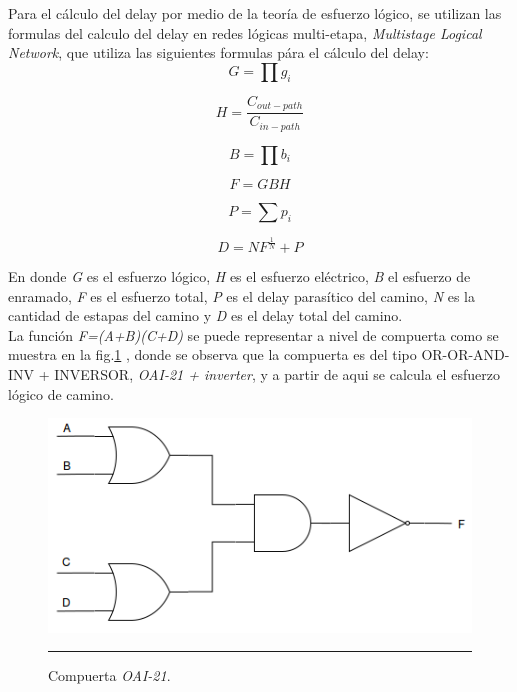 \documentclass[12pt,a4paper]{article} %
\begin{document}
{Para el cálculo del delay por medio de la teoría de esfuerzo lógico, se utilizan las formulas del calculo del delay en redes lógicas multi-etapa, \textit{Multistage Logical Network}, que utiliza las siguientes formulas pára el cálculo del delay:\\

\begin{equation}\label{eqn:esfuerzo_logico}
G= \prod g_{i}
\end{equation}

\begin{equation}\label{eqn:esfuerzo_electrico}
H= \frac{C_{out-path}}{C_{in-path}}
\end{equation}

\begin{equation}\label{eqn:esfuerzo_enramado}
B= \prod b_{i}
\end{equation}

\begin{equation}\label{eqn:esfuerzo}
F = GBH
\end{equation}

\begin{equation}\label{eqn:delay_parasitico}
P = \sum p_{i}
\end{equation}

\begin{equation}\label{eqn:delay}
D = NF^{\frac{1}{N}} + P
\end{equation}

En donde \textit{G} es el esfuerzo lógico, \textit{H} es el esfuerzo eléctrico, \textit{B} el esfuerzo de enramado, \textit{F} es el esfuerzo total, \textit{P} es el delay parasítico del camino, \textit{N} es la cantidad de estapas del camino y \textit{D} es el delay total del camino.\\

La función \textit{F=(A+B)(C+D)} se puede representar a nivel de compuerta como se muestra en la fig.\ref{fig:OAI21} , donde se observa que la compuerta es del tipo OR-OR-AND-INV + INVERSOR, \textit{OAI-21 + inverter}, y a partir de aqui se calcula el esfuerzo lógico de camino.\\

\begin{figure}[htbp]
  \centering
    \includegraphics[scale=0.5]{./OAI21.png}
    \rule{35em}{0.5pt}
  \caption[IdealvsSim]{Compuerta \textit{OAI-21}.}
  \label{fig:OAI21}
\end{figure}\\

}
\end{document}
